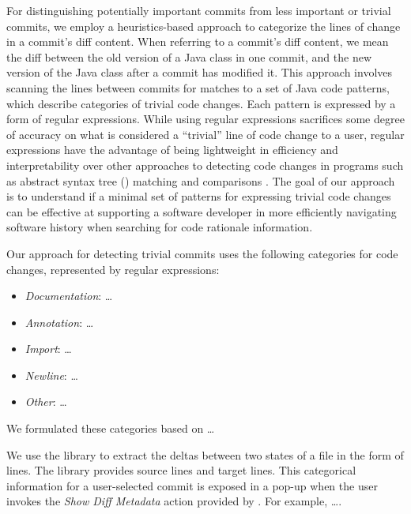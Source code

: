For distinguishing potentially important commits from less important or trivial commits, we employ a heuristics-based approach to categorize the lines of change in a commit's diff content.
When referring to a commit's diff content, we mean the diff between the old version of a Java class in one commit, and the new version of the Java class after a commit has modified it.
This approach involves scanning the lines between commits for matches to a set of Java code patterns, which describe categories of trivial code changes.
Each pattern is expressed by a form of regular expressions.
While using regular expressions sacrifices some degree of accuracy on what is considered a ``trivial'' line of code change to a user,
regular expressions have the advantage of being lightweight in efficiency and interpretability over other approaches to detecting code changes in programs such as abstract syntax tree () matching and comparisons \cite{murphy_lightweight_1996}.
The goal of our approach is to understand if a minimal set of patterns for expressing trivial code changes can be effective at supporting a software developer in more efficiently navigating software history when searching for code rationale information.

Our approach for detecting trivial commits uses the following categories for code changes, represented by regular expressions: 

\begin{itemize}
    \item \textit{Documentation}: \dots
    \item \textit{Annotation}: \dots
    \item \textit{Import}: \dots
    \item \textit{Newline}: \dots
    \item \textit{Other}: \dots
\end{itemize}

We formulated these categories based on \dots {}

We use the  \cite{java-diff-utils} library to extract the deltas between two states of a file in the form of lines. 
The library provides source lines and target lines. 
This categorical information for a user-selected commit is exposed in a pop-up when the user invokes the \textit{Show Diff Metadata} action provided by .
For example, \dots {}.

